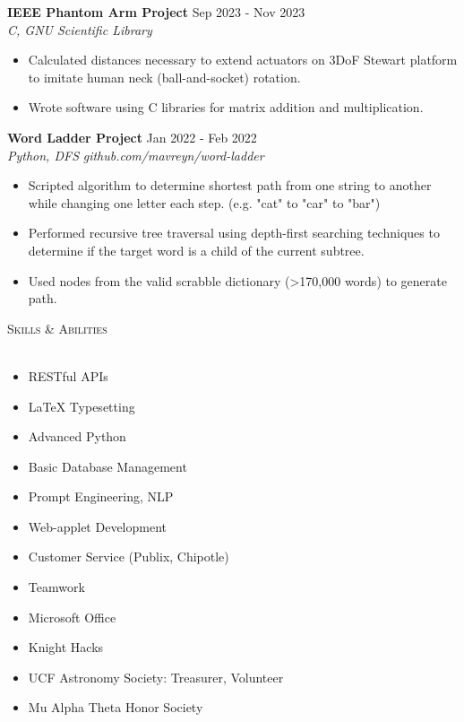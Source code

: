 \documentclass[letterpaper]{article}
\newcommand{\lineunder} {
    \vspace*{-8pt} \\
    \hspace*{-18pt} \hrulefill \\
}
\newcommand{\header} [1] {
    {\hspace*{-18pt}\vspace*{12pt} \large\textsc{#1}}
    \vspace*{-12pt} \lineunder
}
\begin{document}
\textbf{IEEE Phantom Arm Project} \hfill Sep 2023 - Nov 2023\\
\textit{C, GNU Scientific Library} \\
\vspace{-1mm}
\begin{itemize} \itemsep 1pt
	\item Calculated distances necessary to extend actuators on 3DoF Stewart platform to imitate human neck (ball-and-socket) rotation.
	\item Wrote software using C libraries for matrix addition and multiplication.
\end{itemize}

\textbf{Word Ladder Project} \hfill Jan 2022 - Feb 2022\\
\textit{Python, DFS} \hfill \textit{github.com/mavreyn/word-ladder}\\
\vspace{-1mm}
\begin{itemize} \itemsep 1pt
	\item Scripted algorithm to determine shortest path from one string to another while changing one letter each step. (e.g. "cat" to "car" to "bar")
	\item Performed recursive tree traversal using depth-first searching techniques to determine if the target word is a child of the current subtree.
    \item Used nodes from the valid scrabble dictionary (>170,000 words) to generate path.
\end{itemize}


\header{Skills \& Abilities}
\begin{multicols}{2}
    \begin{itemize} \itemsep 1pt
        \item RESTful APIs
        \item LaTeX Typesetting
        \item Advanced Python
        \item Basic Database Management
        \item Prompt Engineering, NLP
        \item Web-applet Development
        \item Customer Service (Publix, Chipotle)
        \item Teamwork
        \item Microsoft Office
        \item Knight Hacks
        \item UCF Astronomy Society: Treasurer, Volunteer
        \item Mu Alpha Theta Honor Society
    \end{itemize}
\end{multicols}
\end{document}
